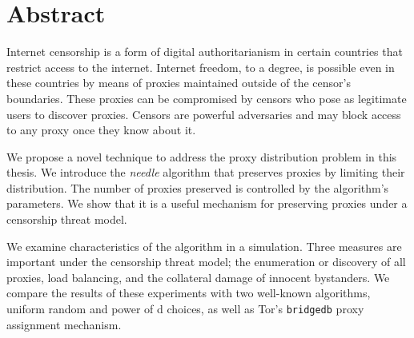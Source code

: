 \chapter{Abstract}
\label{sec:abstract}

Internet censorship is a form of digital authoritarianism in certain countries that restrict access to the internet. Internet freedom, to a degree, is possible even in these countries by means of proxies maintained outside of the censor's boundaries. These proxies can be compromised by censors who pose as legitimate users to discover proxies. Censors are powerful adversaries and may block access to any proxy once they know about it.

We propose a novel technique to address the proxy distribution problem in this thesis. We introduce the \textit{needle} algorithm that preserves proxies by limiting their distribution. The number of proxies preserved is controlled by the algorithm's parameters. We show that it is a useful mechanism for preserving proxies under a censorship threat model. 

We examine characteristics of the algorithm in a simulation. Three measures are important under the censorship threat model; the enumeration or discovery of all proxies, load balancing, and the collateral damage of innocent bystanders. We compare the results of these experiments with two well-known algorithms, uniform random and power of d choices, as well as Tor's \texttt{bridgedb} proxy assignment mechanism. 